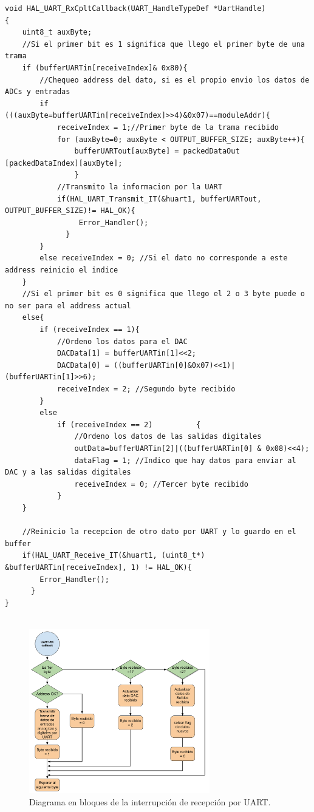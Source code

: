 \begin{lstlisting}[label=cod:codigoUART, caption= Código del callback de interrupción de recepción por UART.]
void HAL_UART_RxCpltCallback(UART_HandleTypeDef *UartHandle)
{
	uint8_t auxByte;
	//Si el primer bit es 1 significa que llego el primer byte de una trama
	if (bufferUARTin[receiveIndex]& 0x80){
		//Chequeo address del dato, si es el propio envio los datos de ADCs y entradas
		if (((auxByte=bufferUARTin[receiveIndex]>>4)&0x07)==moduleAddr){
			receiveIndex = 1;//Primer byte de la trama recibido
			for (auxByte=0; auxByte < OUTPUT_BUFFER_SIZE; auxByte++){
				bufferUARTout[auxByte] = packedDataOut [packedDataIndex][auxByte];
				}
			//Transmito la informacion por la UART
			if(HAL_UART_Transmit_IT(&huart1, bufferUARTout, OUTPUT_BUFFER_SIZE)!= HAL_OK){
				 Error_Handler();
			  }
		}
		else receiveIndex = 0; //Si el dato no corresponde a este address reinicio el indice
	}
	//Si el primer bit es 0 significa que llego el 2 o 3 byte puede o no ser para el address actual
	else{
		if (receiveIndex == 1){
			//Ordeno los datos para el DAC
			DACData[1] = bufferUARTin[1]<<2; 
			DACData[0] = ((bufferUARTin[0]&0x07)<<1)|(bufferUARTin[1]>>6); 
			receiveIndex = 2; //Segundo byte recibido
		}
		else
			if (receiveIndex == 2)			{
				//Ordeno los datos de las salidas digitales
				outData=bufferUARTin[2]|((bufferUARTin[0] & 0x08)<<4);
				dataFlag = 1; //Indico que hay datos para enviar al DAC y a las salidas digitales
				receiveIndex = 0; //Tercer byte recibido
			}
	}

	//Reinicio la recepcion de otro dato por UART y lo guardo en el buffer
	if(HAL_UART_Receive_IT(&huart1, (uint8_t*) &bufferUARTin[receiveIndex], 1) != HAL_OK){
	    Error_Handler();
	  }
}


\end{lstlisting}

\begin{figure}[ht]
	\centering
	\includegraphics[width=0.7\textwidth]{./Figures/BloquesUart.pdf}
	\caption{Diagrama en bloques de la interrupción de recepción por UART.}
	\label{fig:BloquesUart}
\end{figure}


